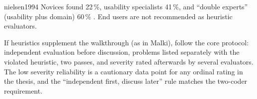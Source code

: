 \begin{papercard}{nielsen1994}
 Novices found 22\,\%, usability specialists 41\,\%, and ``double experts'' (usability plus domain) 60\,\% . End users are not recommended as heuristic evaluators.

 If heuristics supplement the walkthrough (as in Malki), follow the core protocol: independent evaluation before discussion, problems listed separately with the violated heuristic, two passes, and severity rated afterwards by several evaluators. The low severity reliability is a cautionary data point for any ordinal rating in the thesis, and the ``independent first, discuss later'' rule matches the two-coder requirement.
\end{papercard}
